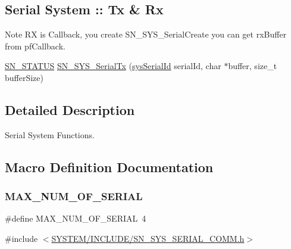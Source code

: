 \subsection*{Serial System \+:\+: Tx \& Rx}
\label{_amgrp5fd2a37710a455c472ae6280e9ba6efe}%
\begin{DoxyNote}{Note}
RX is Callback, you create \textquotesingle{}S\+N\+\_\+\+S\+Y\+S\+\_\+\+Serial\+Create\textquotesingle{} you can get rx\+Buffer from pf\+Callback. 
\end{DoxyNote}
\begin{DoxyCompactItemize}
\item 
\hyperlink{group__SYSTEM__ERROR_ga4540713b9a7a18ce44d78c3a10f7442f}{S\+N\+\_\+\+S\+T\+A\+T\+US} \hyperlink{group__SYSTEM__SERIAL__COMM_ga0ef5403b40b3522653366b6246dbf752}{S\+N\+\_\+\+S\+Y\+S\+\_\+\+Serial\+Tx} (\hyperlink{structsys__serial__id}{sys\+Serial\+Id} serial\+Id, char $\ast$buffer, size\+\_\+t buffer\+Size)
\end{DoxyCompactItemize}


\subsection{Detailed Description}
Serial System Functions. 



\subsection{Macro Definition Documentation}
\mbox{\label{group__SYSTEM__SERIAL__COMM_gab19b7880962ae52d90f784158f56f9f5}} 
\subsubsection{\texorpdfstring{M\+A\+X\+\_\+\+N\+U\+M\+\_\+\+O\+F\+\_\+\+S\+E\+R\+I\+AL}{MAX\_NUM\_OF\_SERIAL}}
{\footnotesize\ttfamily \#define M\+A\+X\+\_\+\+N\+U\+M\+\_\+\+O\+F\+\_\+\+S\+E\+R\+I\+AL~4}



{\ttfamily \#include $<$\hyperlink{SN__SYS__SERIAL__COMM_8h}{S\+Y\+S\+T\+E\+M/\+I\+N\+C\+L\+U\+D\+E/\+S\+N\+\_\+\+S\+Y\+S\+\_\+\+S\+E\+R\+I\+A\+L\+\_\+\+C\+O\+M\+M.\+h}$>$}

